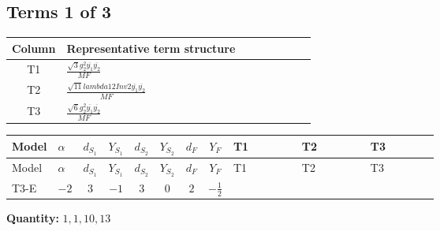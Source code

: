 \documentclass[8pt]{article}
\begin{document}
\begin{landscape}
\subsection*{Terms 1 of 3}
\begin{center}
\begin{tabular}{@{}c >{\raggedright\arraybackslash}p{0.82\linewidth}@{}}
\toprule
Column & Representative term structure \\
\midrule
T1 & \(\displaystyle \frac{\sqrt{3} g_{2}^{2} \overline{y_{1}} \overline{y_{2}}}{MF}\) \\
\midrule
T2 & \(\displaystyle \frac{\sqrt{11} lambda12Inv2 \overline{y_{1}} \overline{y_{2}}}{MF}\) \\
\midrule
T3 & \(\displaystyle \frac{\sqrt{6} g_{2}^{2} \overline{y_{1}} \overline{y_{2}}}{MF}\) \\
\midrule
\bottomrule
\end{tabular}
\end{center}
\smallskip
\tiny
\begin{longtable}{@{}llcccccc >{\raggedright\arraybackslash}p{0.21\linewidth} >{\raggedright\arraybackslash}p{0.21\linewidth} >{\raggedright\arraybackslash}p{0.21\linewidth}@{}}
\toprule
Model & $\alpha$ & $d_{S_1}$ & $Y_{S_1}$ & $d_{S_2}$ & $Y_{S_2}$ & $d_F$ & $Y_F$ & T1 & T2 & T3 \\
\midrule
\endfirsthead
\toprule
Model & $\alpha$ & $d_{S_1}$ & $Y_{S_1}$ & $d_{S_2}$ & $Y_{S_2}$ & $d_F$ & $Y_F$ & T1 & T2 & T3 \\
\midrule
\endhead
T3-E & $-2$ & $3$ & $-1$ & $3$ & $0$ & $2$ & $-\frac{1}{2}$ & \scriptsize\adjustbox{max width=\linewidth}{$\begin{gathered} - \frac{49 \sqrt{3} g_{2}^{2} \overline{y_{1}} \overline{y_{2}}}{24 MF}\end{gathered}$} & \scriptsize\adjustbox{max width=\linewidth}{$\begin{gathered} - \frac{3 \sqrt{11} lambda12Inv2 \overline{y_{1}} \overline{y_{2}}}{22 MF}\end{gathered}$} & \scriptsize\adjustbox{max width=\linewidth}{$\begin{gathered} - \frac{\sqrt{6} g_{2}^{2} \overline{y_{1}} \overline{y_{2}}}{3 MF}\end{gathered}$} \\
\midrule
\bottomrule
\end{longtable}
\clearpage
\noindent\textbf{Quantity: }$\mathrm{1,1,10,13}$\par\smallskip

\end{landscape}
\end{document}
